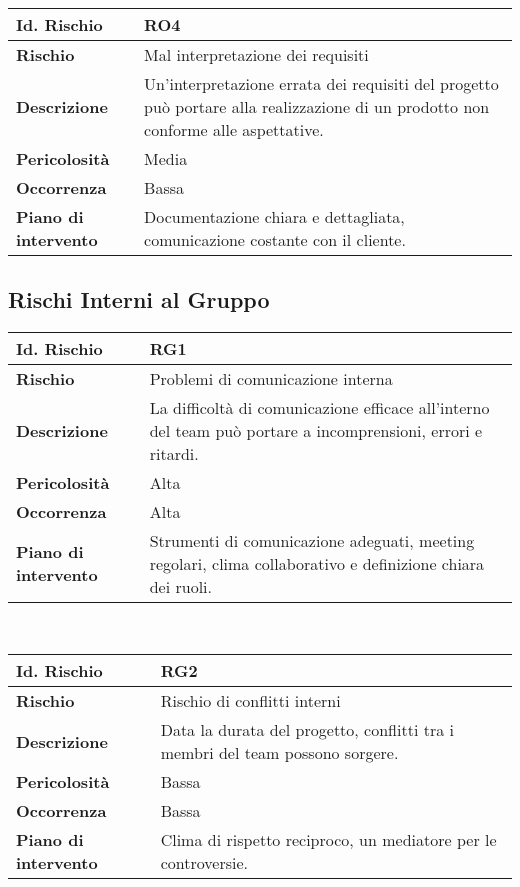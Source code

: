 \\[30pt]
\begin{tabular}{|L{4cm}|L{9.7cm}|}
    \hline
    \textbf{Id. Rischio} & \textbf{RO4} \\
    \hline
    \textbf{Rischio} & Mal interpretazione dei requisiti \\
    \hline
    \textbf{Descrizione} & Un'interpretazione errata dei requisiti del progetto può portare alla realizzazione di un prodotto non conforme alle aspettative. \\
    \hline
    \textbf{Pericolosità} & Media \\
    \hline
    \textbf{Occorrenza} & Bassa \\
    \hline
    \textbf{Piano di intervento} & Documentazione chiara e dettagliata, comunicazione costante con il cliente. \\
    \hline
\end{tabular}

\subsection{Rischi Interni al Gruppo}

\begin{tabular}{|L{4cm}|L{9.7cm}|}
    \hline
    \textbf{Id. Rischio} & \textbf{RG1} \\
    \hline
    \textbf{Rischio} & Problemi di comunicazione interna \\
    \hline
    \textbf{Descrizione} & La difficoltà di comunicazione efficace all'interno del team può portare a incomprensioni, errori e ritardi. \\
    \hline
    \textbf{Pericolosità} & Alta \\
    \hline
    \textbf{Occorrenza} & Alta \\
    \hline
    \textbf{Piano di intervento} & Strumenti di comunicazione adeguati, meeting regolari, clima collaborativo e definizione chiara dei ruoli. \\
    \hline
\end{tabular}
\\[30pt]
\begin{tabular}{|L{4cm}|L{9.7cm}|}
    \hline
    \textbf{Id. Rischio} & \textbf{RG2} \\
    \hline
    \textbf{Rischio} & Rischio di conflitti interni \\
    \hline
    \textbf{Descrizione} & Data la durata del progetto, conflitti tra i membri del team possono sorgere. \\
    \hline
    \textbf{Pericolosità} & Bassa \\
    \hline
    \textbf{Occorrenza} & Bassa \\
    \hline
    \textbf{Piano di intervento} & Clima di rispetto reciproco, un mediatore per le controversie. \\
    \hline
\end{tabular}